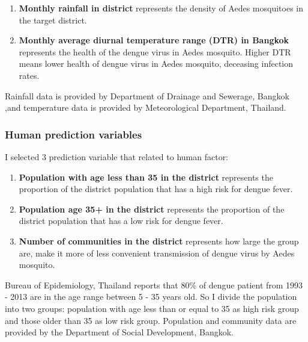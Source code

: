 \documentclass[review]{elsarticle}
\begin{document}
\begin{enumerate}
	\item \textbf{Monthly rainfall in district} represents the density of Aedes mosquitoes in the target district. 
	
	\item \textbf{Monthly average diurnal temperature range (DTR) in Bangkok} represents the health of the dengue virus in Aedes mosquito. Higher DTR means  lower health of dengue virus in Aedes mosquito, deceasing infection rates.
\end{enumerate}

Rainfall data is provided by Department of Drainage and Sewerage, Bangkok ,and temperature data is provided by Meteorological Department, Thailand.


\subsubsection{Human prediction variables}

I selected 3 prediction variable that related to human factor:

\begin{enumerate}
	\item \textbf{Population with age less than 35 in the district} represents the proportion of the district population that has a high risk for dengue fever. 
	
	\item \textbf{Population age 35+ in the district} represents the proportion of the district population that has a low risk for dengue fever.
	
	
	\item \textbf{Number of communities  in  the district} represents how large the group are, make it more of less convenient transmission of dengue virus by Aedes mosquito.
	
\end{enumerate}

Bureau of Epidemiology, Thailand reports that 80\% of dengue patient from 1993 - 2013 are in the age range between 5 - 35 years old. So I divide the population into two groups: population with age less than or equal to 35 as high risk group and those older than 35 as low risk group. Population and community data are provided by the Department of Social Development, Bangkok. 
\end{document}
